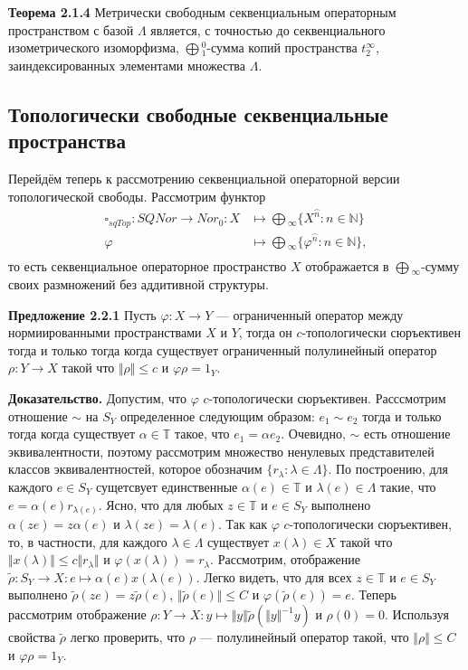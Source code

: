 \documentclass[12pt]{article}
\begin{document}
{\bf Теорема 2.1.4} Метрически свободным секвенциальным операторным пространством с базой $\Lambda$ является, с точностью до секвенциального изометрического изоморфизма, 
$\bigoplus{}_1^0$-сумма копий пространства $t_2^{\infty}$, заиндексированных элементами множества $\Lambda$. 

\subsection{Топологически свободные секвенциальные пространства}

Перейдём теперь к рассмотрению секвенциальной операторной версии  топологической свободы. Рассмотрим функтор 
$$
\begin{aligned}
\square_{sqTop} : SQNor \to Nor_0: X &\mapsto \bigoplus{}_\infty \{X^{\wideparen{n}} : n \in \mathbb{N}\}\\
\varphi&\mapsto\bigoplus{}_\infty\{\varphi^{\wideparen{n}}:n\in\mathbb{N}\},\\
\end{aligned}
$$ 
то есть секвенциальное операторное пространство $X$ отображается в $\bigoplus{}_\infty$-сумму своих размножений без аддитивной структуры.

{\bf Предложение 2.2.1} Пусть $\varphi:X\to Y$ --- ограниченный оператор между нормиированными пространствами $X$ и $Y$, тогда он $c$-топологически сюръективен тогда и только тогда когда существует ограниченный полулинейный оператор $\rho:Y\to X$ такой что $\Vert\rho\Vert\leq c$ и $\varphi\rho=1_Y$.

{\bf Доказательство.} Допустим, что $\varphi$ $c$-топологически сюръективен. Расссмотрим отношение $\sim$ на $S_Y$ определенное следующим образом: $e_1\sim e_2$ тогда и только тогда когда существует $\alpha\in\mathbb{T}$ такое, что $e_1=\alpha e_2$. Очевидно, $\sim$ есть отношение эквивалентности, поэтому рассмотрим множество ненулевых представителей классов эквивалентностей, которое обозначим $\{r_\lambda:\lambda\in\Lambda\}$. По построению, для каждого $e\in S_Y$ сущетсвует единственные $\alpha(e)\in\mathbb{T}$ и $\lambda(e)\in\Lambda$ такие, что $e=\alpha(e)r_{\lambda(e)}$. Ясно, что для любых $z\in\mathbb{T}$ и $e\in S_Y$ выполнено $\alpha(ze)=z\alpha(e)$ и $\lambda(ze)=\lambda(e)$. Так как $\varphi$ $c$-топологически сюръективен, то, в частности, для каждого $\lambda\in\Lambda$ существует $x(\lambda)\in X$ такой что $\Vert x(\lambda)\Vert\leq c\Vert r_\lambda\Vert$ и $\varphi(x(\lambda))=r_\lambda$. Рассмотрим, отображение $\tilde{\rho}:S_Y\to X:e\mapsto \alpha(e)x(\lambda(e))$. Легко видеть, что для всех $z\in\mathbb{T}$ и $e\in S_Y$ выполнено $\tilde{\rho}(z e)=z\tilde{\rho}(e)$, $\Vert\tilde{\rho}(e)\Vert\leq C$ и $\varphi(\tilde{\rho}(e))=e$. Теперь рассмотрим отображение $\rho:Y\to X: y\mapsto \Vert y\Vert\tilde{\rho}(\Vert y\Vert^{-1} y)$ и $\rho(0)=0$. Используя свойства $\tilde{\rho}$ легко проверить, что $\rho$ --- полулинейный оператор такой, что $\Vert\rho\Vert\leq C$ и $\varphi\rho=1_Y$.
\end{document}
